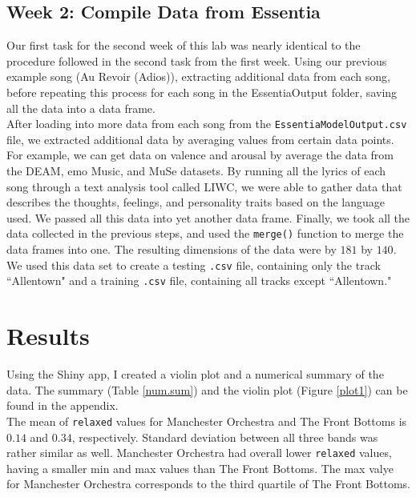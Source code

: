 \documentclass{article}\usepackage[]{graphicx}\usepackage[]{xcolor}
\begin{document}
\begin{multicols}{2}
\subsection{Week 2: Compile Data from Essentia}
Our first task for the second week of this lab was nearly identical to the procedure followed in the second task from the first week. Using our previous example song (Au Revoir (Adios)), extracting additional data from each song, before repeating this process for each song in the EssentiaOutput folder, saving all the data into a data frame. \\
\indent After loading into more data from each song from the \texttt{EssentiaModelOutput.csv} file, we extracted additional data by averaging values from certain data points. For example, we can get data on valence and arousal by average the data from the DEAM, emo Music, and MuSe datasets. 
\indent By running all the lyrics of each song through a text analysis tool called LIWC, we were able to gather data that describes the thoughts, feelings, and personality traits based on the language used. We passed all this data into yet another data frame. 
\indent Finally, we took all the data collected in the previous steps, and used the \verb|merge()| function to merge the data frames into one. The resulting dimensions of the data were by $181$ by $140$. We used this data set to create a testing \texttt{.csv} file, containing only the track ``Allentown" and a training \texttt{.csv} file, containing all tracks except ``Allentown."

\section{Results}
Using the Shiny app, I created a violin plot and a numerical summary of the data. The summary (Table \ref{num.sum}) and the violin plot (Figure \ref{plot1}) can be found in the appendix. \\
\indent The mean of \texttt{relaxed} values for Manchester Orchestra and The Front Bottoms is $0.14$ and $0.34$, respectively. Standard deviation between all three bands was rather similar as well. Manchester Orchestra had overall lower \texttt{relaxed} values, having a smaller min and max values than The Front Bottoms. The max valye for Manchester Orchestra corresponds to the third quartile of The Front Bottoms. 


\end{multicols}
\end{document}
